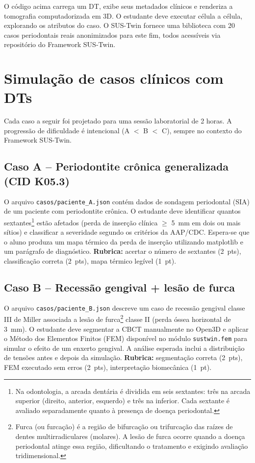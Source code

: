 O código acima carrega um DT, exibe seus metadados clínicos e renderiza a
tomografia computadorizada em 3D. O estudante deve executar célula a célula,
explorando os atributos do caso. O SUS-Twin fornece uma biblioteca com 20
casos periodontais reais anonimizados para este fim, todos acessíveis via
repositório do Framework SUS-Twin.

\section{Simulação de casos clínicos com DTs}
\label{sec:simulacao-casos}

Cada caso a seguir foi projetado para uma sessão laboratorial de 2 horas. A
progressão de dificuldade é intencional (A $<$ B $<$ C), sempre no contexto do
Framework SUS-Twin.

\subsection*{Caso A -- Periodontite crônica generalizada (CID K05.3)}

O arquivo \texttt{casos/paciente\_A.json} contém dados de sondagem
periodontal (SIA) de um paciente com periodontite crônica. O estudante deve
identificar quantos sextantes\footnote{Na odontologia, a arcada dentária é
dividida em seis sextantes: três na arcada superior (direito, anterior,
esquerdo) e três na inferior. Cada sextante é avaliado separadamente quanto
à presença de doença periodontal.} estão afetados (perda de inserção
clínica $\geq$ 5~mm em dois ou mais sítios) e classificar a severidade
segundo os critérios da AAP/CDC. Espera-se que o aluno produza um mapa
térmico da perda de inserção utilizando matplotlib e um parágrafo de
diagnóstico. \textbf{Rubrica:} acertar o número de sextantes (2~pts),
classificação correta (2~pts), mapa térmico legível (1~pt).

\subsection*{Caso B -- Recessão gengival + lesão de furca}

O arquivo \texttt{casos/paciente\_B.json} descreve um caso de recessão
gengival classe III de Miller associada a lesão de furca\footnote{Furca (ou
furcação) é a região de bifurcação ou trifurcação das raízes de dentes
multirradiculares (molares). A lesão de furca ocorre quando a doença
periodontal atinge essa região, dificultando o tratamento e exigindo
avaliação tridimensional.} classe II (perda óssea horizontal de 3~mm). O
estudante deve segmentar a CBCT manualmente no Open3D e aplicar o Método dos
Elementos Finitos (FEM) disponível no módulo \texttt{sustwin.fem} para
simular o efeito de um enxerto gengival. A análise esperada inclui a
distribuição de tensões antes e depois da simulação.
\textbf{Rubrica:} segmentação correta (2~pts), FEM executado sem erros
(2~pts), interpretação biomecânica (1~pt).

